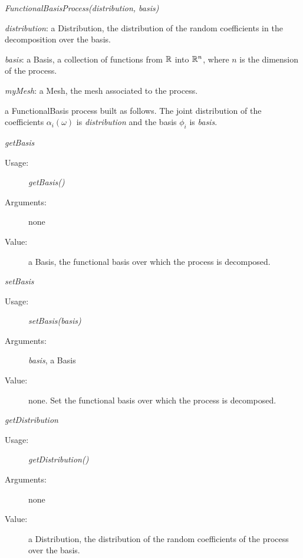 \begin{description}

\item[Usage:] \textit{FunctionalBasisProcess(distribution, basis)}
\bigskip

\item[Arguments:]  \rule{0pt}{1em}
\begin{description}
\item \textit{distribution}: a Distribution, the distribution of the random coefficients in the decomposition over the basis.
\item \textit{basis}: a Basis, a collection of functions from ${\mathbb R}$ into ${\mathbb R}^n$, where $n$ is the dimension of the process.
\item \textit{myMesh}: a Mesh, the mesh associated to the process.
\end{description}
\bigskip

\item[Value:] a FunctionalBasis process built as follows. The joint distribution of the coefficients $\alpha_i(\omega)$ is \textit{distribution} and the basis $\phi_i$ is \textit{basis}.

\item[Some methods :]  \rule{0pt}{1em}

\begin{description}

\item \textit{getBasis}
\begin{description}
\item[Usage:] \textit{getBasis()}
\item[Arguments:] none
\item[Value:] a Basis, the functional basis over which the process is decomposed.
\end{description}
\bigskip

\item \textit{setBasis}
\begin{description}
\item[Usage:] \textit{setBasis(basis)}
\item[Arguments:] \textit{basis}, a Basis
\item[Value:] none. Set the functional basis over which the process is decomposed.
\end{description}
\bigskip

\item \textit{getDistribution}
\begin{description}
\item[Usage:] \textit{getDistribution()}
\item[Arguments:] none
\item[Value:] a Distribution, the distribution of the random coefficients of the process over the basis.
\end{description}
\bigskip


\end{description}
\end{description}
